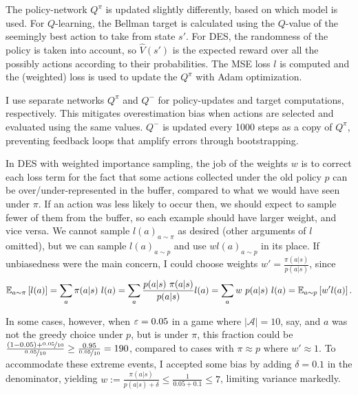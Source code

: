 \documentclass{article}
\begin{document}
The policy-network \(Q^\pi\) is updated slightly differently, based on which model is used. For \(Q\)-learning, the Bellman target is calculated using the \(Q\)-value of the seemingly best action to take from state \(s'\). For DES, the randomness of the policy is taken into account, so \(\hat{V}(s')\) is the expected reward over all the possibly actions according to their probabilities. The MSE loss \(l\) is computed and the (weighted) loss is used to update the \(Q^\pi\) with Adam optimization.

I use separate networks \(Q^\pi\) and \(Q^-\) for policy-updates and target computations, respectively. This mitigates overestimation bias when actions are selected and evaluated using the same values. \(Q^-\) is updated every 1000 steps as a copy of \(Q^\pi\), preventing feedback loops that amplify errors through bootstrapping.

In DES with weighted importance sampling, the job of the weights \(w\) is to correct each loss term for the fact that some actions collected under the old policy \(p\) can be over/under-represented in the buffer, compared to what we would have seen under \(\pi\). If an action was less likely to occur then, we should expect to sample fewer of them from the buffer, so each example should have larger weight, and vice versa. We cannot sample \(l(a)_{a \sim \pi}\) as desired (other arguments of \(l\) omitted), but we can sample \(l(a)_{a \sim p}\) and use \(w l(a)_{a \sim p}\) in its place. If unbiasedness were the main concern, I could choose weights \(w' = \frac{\pi(a|s)}{p(a|s)}\), since
\[
    \mathbb{E}_{a \sim \pi}\left[ l(a) \right]
    = \sum_{a} {\pi(a|s) \ l(a)}
    = \sum_{a} {\frac{p(a|s) \ \pi(a|s)}{p(a|s)} l(a)}
    = \sum_{a} {w \ p(a|s) \ l(a)}
    = \mathbb{E}_{a \sim p} \left[ w' l(a) \right].
\]

In some cases, however, when \(\varepsilon=0.05\) in a game where \(|\mathcal{A}| = 10\), say, and \(a\) was not the greedy choice under \(p\), but is under \(\pi\), this fraction could be \(\frac{(1-0.05) + \nicefrac{0.05}{10}}{\nicefrac{0.05}{10}} \ge \frac{0.95}{\nicefrac{0.05}{10}} = 190\), compared to cases with \(\pi \approx p\) where \(w' \approx 1\). To accommodate these extreme events, I accepted some bias by adding \(\delta = 0.1\) in the denominator, yielding \(w := \frac{\pi(a|s)}{p(a|s) + \delta} \le \frac{1}{0.05 + 0.1} \le 7\), limiting variance markedly.
\end{document}
